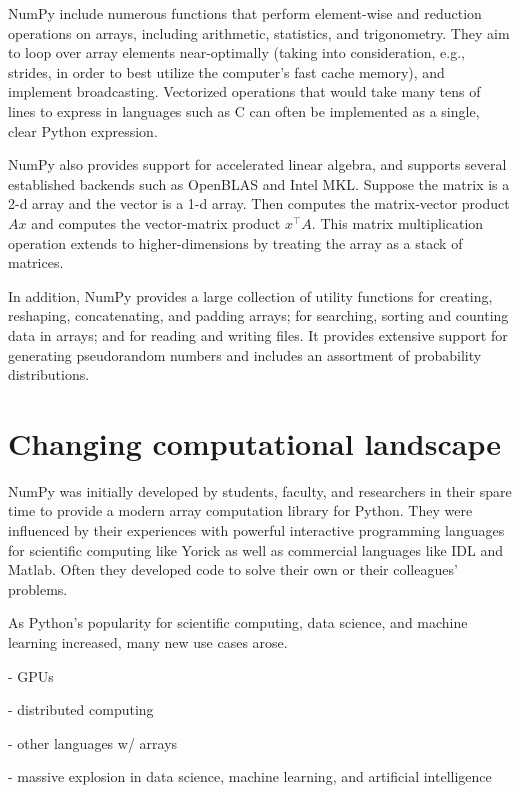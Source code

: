 NumPy include numerous functions that perform element-wise and reduction
operations on arrays, including arithmetic, statistics, and trigonometry.
They aim to loop over array elements near-optimally (taking into consideration,
e.g., strides, in order to best utilize the computer's fast cache memory), and
implement broadcasting.
Vectorized operations that would take many tens of lines to express in
languages such as C can often be implemented as a single, clear Python
expression.

NumPy also provides support for accelerated linear algebra, and supports
several established backends such as OpenBLAS and Intel MKL.
Suppose the matrix  is a 2-d array and the vector  is a 1-d array.
Then  computes the matrix-vector product $Ax$ and  computes
the vector-matrix product $x^\top A$.
This matrix multiplication operation extends to higher-dimensions by treating
the array as a stack of matrices.

In addition, NumPy provides a large collection of utility functions for
creating, reshaping, concatenating, and padding arrays; for searching, sorting
and counting data in arrays; and for reading and writing files.
It provides extensive support for generating pseudorandom numbers and includes
an assortment of probability distributions.


\section*{Changing computational landscape}


NumPy was initially developed by students, faculty, and researchers in their
spare time to provide a modern array computation library for Python.
They were influenced by their experiences with powerful interactive programming
languages for scientific computing like Yorick \cite{munro1995using} as well
as commercial languages like IDL and Matlab.
Often they developed code to solve their own or their colleagues' problems.

As Python's popularity for scientific computing, data science, and machine
learning increased, many new use cases arose.

- GPUs

- distributed computing

- other languages w/ arrays

- massive explosion in data science, machine learning, and artificial intelligence

